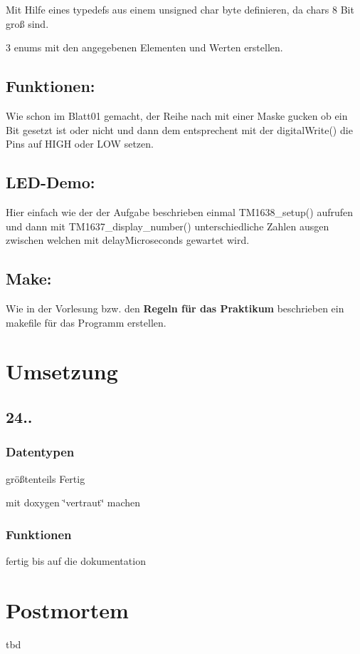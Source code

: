 \begin{DoxyEnumerate}
\item Mit Hilfe eines typedefs aus einem unsigned char byte definieren, da chars 8 Bit groß sind.
\item 3 enums mit den angegebenen Elementen und Werten erstellen.
\end{DoxyEnumerate}\hypertarget{md_lerntagebuch_autotoc_md7}{}\subsection{Funktionen\+:}\label{md_lerntagebuch_autotoc_md7}
Wie schon im Blatt01 gemacht, der Reihe nach mit einer Maske gucken ob ein Bit gesetzt ist oder nicht und dann dem entsprechent mit der {\ttfamily digital\+Write()} die Pins auf H\+I\+GH oder L\+OW setzen.\hypertarget{md_lerntagebuch_autotoc_md8}{}\subsection{L\+E\+D-\/\+Demo\+:}\label{md_lerntagebuch_autotoc_md8}
Hier einfach wie der der Aufgabe beschrieben einmal {\ttfamily T\+M1638\+\_\+setup()} aufrufen und dann mit {\ttfamily T\+M1637\+\_\+display\+\_\+number()} unterschiedliche Zahlen ausgen zwischen welchen mit {\ttfamily delay\+Microseconds} gewartet wird.\hypertarget{md_lerntagebuch_autotoc_md9}{}\subsection{Make\+:}\label{md_lerntagebuch_autotoc_md9}
Wie in der Vorlesung bzw. den {\bfseries Regeln für das Praktikum} beschrieben ein makefile für das Programm erstellen.\hypertarget{md_lerntagebuch_autotoc_md10}{}\section{Umsetzung}\label{md_lerntagebuch_autotoc_md10}
\hypertarget{md_lerntagebuch_autotoc_md11}{}\subsection{24..}\label{md_lerntagebuch_autotoc_md11}
\hypertarget{md_lerntagebuch_autotoc_md12}{}\subsubsection{Datentypen}\label{md_lerntagebuch_autotoc_md12}

\begin{DoxyItemize}
\item größtenteils Fertig
\item mit doxygen \char`\"{}vertraut\char`\"{} machen 
\end{DoxyItemize}\hypertarget{md_lerntagebuch_autotoc_md13}{}\subsubsection{Funktionen}\label{md_lerntagebuch_autotoc_md13}

\begin{DoxyItemize}
\item fertig bis auf die dokumentation
\end{DoxyItemize}\hypertarget{md_lerntagebuch_autotoc_md14}{}\section{Postmortem}\label{md_lerntagebuch_autotoc_md14}
tbd 